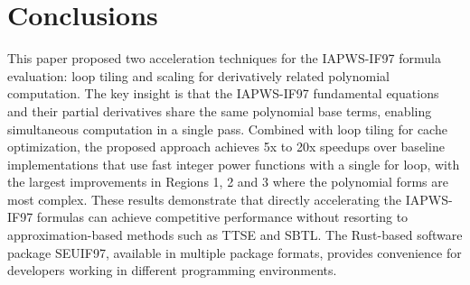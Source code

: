 \documentclass{article}
\begin{document}
\section{Conclusions}

This paper proposed two acceleration techniques for the IAPWS-IF97 formula evaluation: loop tiling and
scaling for derivatively related polynomial computation. The key insight is that the IAPWS-IF97 fundamental equations and their partial derivatives share the same polynomial base terms, enabling simultaneous computation in a single pass. Combined with loop tiling for cache optimization, the proposed approach achieves 5x to 20x speedups over baseline implementations that use fast integer power functions with a single for loop, with the largest improvements in Regions 1, 2 and 3 where the polynomial forms are most complex. These results demonstrate that directly accelerating the IAPWS-IF97 formulas can achieve competitive performance without resorting to approximation-based methods such as TTSE and SBTL. The Rust-based software package SEUIF97, available in multiple package formats, provides convenience for developers working in different programming environments.
\end{document}
